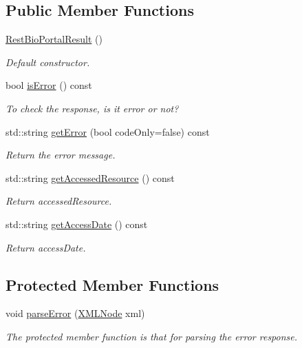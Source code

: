 \subsection*{Public Member Functions}
\begin{DoxyCompactItemize}
\item 
\hyperlink{classunisys_1_1RestBioPortalResult_a90536eac402591f2800dc911ceee8524}{Rest\-Bio\-Portal\-Result} ()
\begin{DoxyCompactList}\small\item\em Default constructor. \end{DoxyCompactList}\item 
bool \hyperlink{classunisys_1_1RestBioPortalResult_adb2db4afa53b07a9232809f1ee37fd26}{is\-Error} () const 
\begin{DoxyCompactList}\small\item\em To check the response, is it error or not? \end{DoxyCompactList}\item 
std\-::string \hyperlink{classunisys_1_1RestBioPortalResult_ad878273301c306e15db63010c079d7cb}{get\-Error} (bool code\-Only=false) const 
\begin{DoxyCompactList}\small\item\em Return the error message. \end{DoxyCompactList}\item 
std\-::string \hyperlink{classunisys_1_1RestBioPortalResult_aaf00d6f0a5fa7a2a4a17442537e08fb5}{get\-Accessed\-Resource} () const 
\begin{DoxyCompactList}\small\item\em Return accessed\-Resource. \end{DoxyCompactList}\item 
std\-::string \hyperlink{classunisys_1_1RestBioPortalResult_ae1eb5f81dc666f1177afead335cb4e61}{get\-Access\-Date} () const 
\begin{DoxyCompactList}\small\item\em Return access\-Date. \end{DoxyCompactList}\end{DoxyCompactItemize}
\subsection*{Protected Member Functions}
\begin{DoxyCompactItemize}
\item 
void \hyperlink{classunisys_1_1RestBioPortalResult_a79edbadd0f6bc46ca2806e83b12ca922}{parse\-Error} (\hyperlink{structXMLNode}{X\-M\-L\-Node} xml)
\begin{DoxyCompactList}\small\item\em The protected member function is that for parsing the error response. \end{DoxyCompactList}\end{DoxyCompactItemize}
